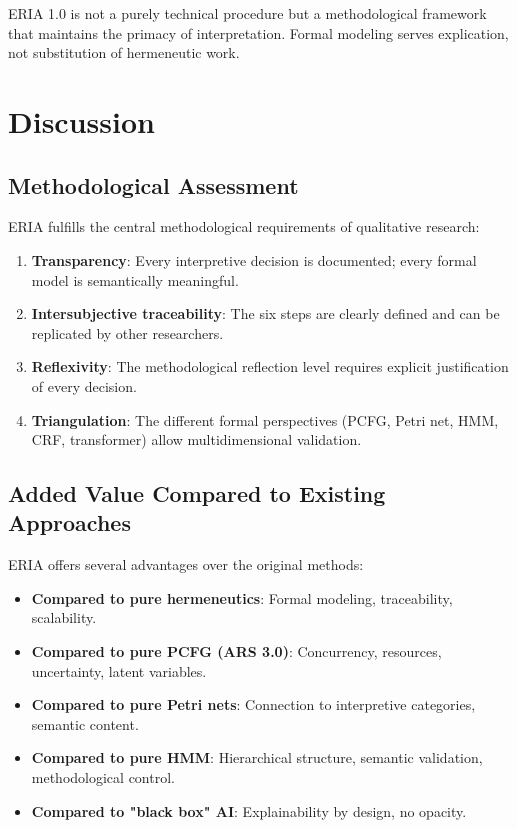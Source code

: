 \documentclass[12pt,a4paper]{article}
\begin{document}
ERIA 1.0 is not a purely technical procedure but a methodological framework that maintains the primacy of interpretation. Formal modeling serves explication, not substitution of hermeneutic work.

\section{Discussion}

\subsection{Methodological Assessment}

ERIA fulfills the central methodological requirements of qualitative research:

\begin{enumerate}
    \item \textbf{Transparency}: Every interpretive decision is documented; every formal model is semantically meaningful.
    
    \item \textbf{Intersubjective traceability}: The six steps are clearly defined and can be replicated by other researchers.
    
    \item \textbf{Reflexivity}: The methodological reflection level requires explicit justification of every decision.
    
    \item \textbf{Triangulation}: The different formal perspectives (PCFG, Petri net, HMM, CRF, transformer) allow multidimensional validation.
\end{enumerate}

\subsection{Added Value Compared to Existing Approaches}

ERIA offers several advantages over the original methods:

\begin{itemize}
    \item \textbf{Compared to pure hermeneutics}: Formal modeling, traceability, scalability.
    \item \textbf{Compared to pure PCFG (ARS 3.0)}: Concurrency, resources, uncertainty, latent variables.
    \item \textbf{Compared to pure Petri nets}: Connection to interpretive categories, semantic content.
    \item \textbf{Compared to pure HMM}: Hierarchical structure, semantic validation, methodological control.
    \item \textbf{Compared to "black box" AI}: Explainability by design, no opacity.
\end{itemize}
\end{document}
